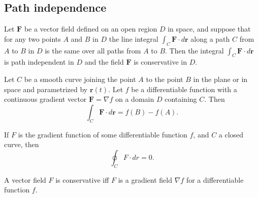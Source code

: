 \documentclass[oneside]{book}
\begin{document}
\subsection{Path independence}
\begin{definition}
	Let \(\textbf{F}\) be a vector field defined on an open region \(D\) in space, and suppose that for any two points \(A\) and \(B\) in \(D\) the line integral \(\int_C \textbf{F}\cdot d\textbf{r}\) along a path \(C\) from \(A\) to \(B\) in \(D\) is the same over all paths from \(A\) to \(B\). Then the integral \(\int_C\textbf{F}\cdot d\textbf{r}\) is path independent in \(D\) and the field \(\textbf{F}\) is conservative in \(D\).
\end{definition}
\begin{theorem}
	Let \(C\) be a smooth curve joining the point \(A\) to the point \(B\) in the plane or in space and parametrized by \(\textbf{r}(t)\). Let \(f\) be a differentiable function with a continuous gradient vector \(\textbf{F}=\nabla f\) on a domain \(D\) containing \(C\). Then
	\begin{equation*}
		\int_C\textbf{F}\cdot d\textbf{r}=f(B)-f(A).
	\end{equation*}
\end{theorem}
\begin{corollary}
	If \(F\) is the gradient function of some differentiable function \(f\), and \(C\) a closed curve, then
	\begin{equation*}
		\oint_C F\cdot dr=0.
	\end{equation*}
\end{corollary}
\begin{theorem}
	A vector field \(F\) is conservative iff \(F\) is a gradient field \(\nabla f\) for a differentiable function \(f\).
\end{theorem}
\end{document}
